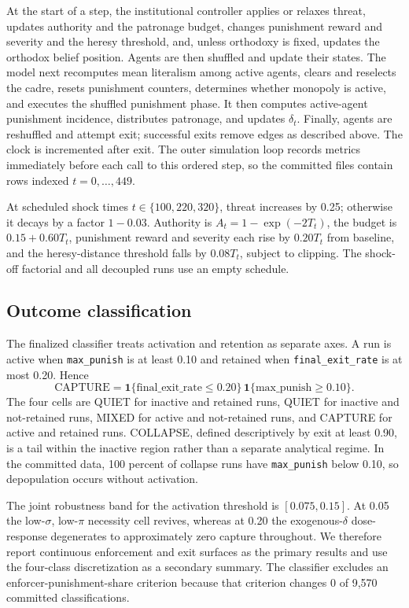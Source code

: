 \documentclass[12pt]{article}
\begin{document}
At the start of a step, the institutional controller applies or relaxes threat, updates authority and the patronage budget, changes punishment reward and severity and the heresy threshold, and, unless orthodoxy is fixed, updates the orthodox belief position. Agents are then shuffled and update their states. The model next recomputes mean literalism among active agents, clears and reselects the cadre, resets punishment counters, determines whether monopoly is active, and executes the shuffled punishment phase. It then computes active-agent punishment incidence, distributes patronage, and updates \(\delta_t\). Finally, agents are reshuffled and attempt exit; successful exits remove edges as described above. The clock is incremented after exit. The outer simulation loop records metrics immediately before each call to this ordered step, so the committed files contain rows indexed \(t=0,\ldots,449\).

At scheduled shock times \(t\in\{100,220,320\}\), threat increases by 0.25; otherwise it decays by a factor \(1-0.03\). Authority is \(A_t=1-\exp(-2T_t)\), the budget is \(0.15+0.60T_t\), punishment reward and severity each rise by \(0.20T_t\) from baseline, and the heresy-distance threshold falls by \(0.08T_t\), subject to clipping. The shock-off factorial and all decoupled runs use an empty schedule.

\subsection{Outcome classification}

The finalized classifier treats activation and retention as separate axes. A run is active when \texttt{max\_punish} is at least 0.10 and retained when \texttt{final\_exit\_rate} is at most 0.20. Hence
\begin{equation}
 \mathrm{CAPTURE}=\mathbf{1}\{\mathrm{final\_exit\_rate}\leq0.20\}\,\mathbf{1}\{\mathrm{max\_punish}\geq0.10\}.
\end{equation}
The four cells are QUIET for inactive and retained runs, QUIET for inactive and not-retained runs, MIXED for active and not-retained runs, and CAPTURE for active and retained runs. COLLAPSE, defined descriptively by exit at least 0.90, is a tail within the inactive region rather than a separate analytical regime. In the committed data, 100 percent of collapse runs have \texttt{max\_punish} below 0.10, so depopulation occurs without activation.

The joint robustness band for the activation threshold is \([0.075,0.15]\). At 0.05 the low-\(\sigma\), low-\(\pi\) necessity cell revives, whereas at 0.20 the exogenous-\(\delta\) dose-response degenerates to approximately zero capture throughout. We therefore report continuous enforcement and exit surfaces as the primary results and use the four-class discretization as a secondary summary. The classifier excludes an enforcer-punishment-share criterion because that criterion changes 0 of 9,570 committed classifications.
\end{document}

